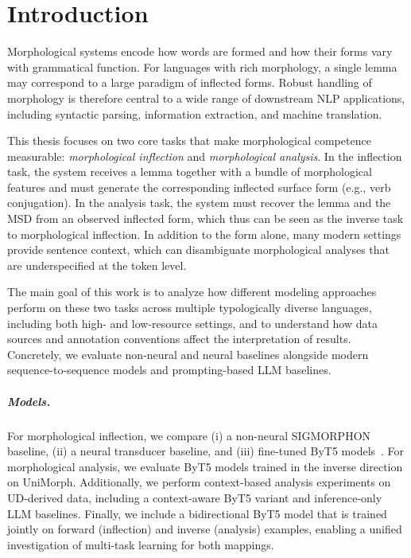 
\chapter{Introduction}\label{chapter:introduction}

Morphological systems encode how words are formed and how their forms vary with grammatical function. For languages with rich morphology, a single lemma may correspond to a large paradigm of inflected forms. Robust handling of morphology is therefore central to a wide range of downstream \ac{NLP} applications, including syntactic parsing, information extraction, and machine translation.

This thesis focuses on two core tasks that make morphological competence measurable: \emph{morphological inflection} and \emph{morphological analysis}. In the inflection task, the system receives a lemma together with a bundle of morphological features and must generate the corresponding inflected surface form (e.g., verb conjugation). In the analysis task, the system must recover the lemma and the \ac{MSD} from an observed inflected form, which thus can be seen as the inverse task to morphological inflection. In addition to the form alone, many modern settings provide sentence context, which can disambiguate morphological analyses that are underspecified at the token level.

The main goal of this work is to analyze how different modeling approaches perform on these two tasks across multiple typologically diverse languages, including both high- and low-resource settings, and to understand how data sources and annotation conventions affect the interpretation of results. Concretely, we evaluate non-neural and neural baselines alongside modern sequence-to-sequence models and prompting-based \ac{LLM} baselines.

\paragraph{Models.}
For morphological inflection, we compare (i) a non-neural SIGMORPHON baseline, (ii) a neural transducer baseline, and (iii) fine-tuned ByT5 models~\parencite{xue-etal-2022-byt5}. For morphological analysis, we evaluate ByT5 models trained in the inverse direction on UniMorph. Additionally, we perform context-based analysis experiments on \ac{UD}-derived data, including a context-aware ByT5 variant and inference-only LLM baselines. Finally, we include a bidirectional ByT5 model that is trained jointly on forward (inflection) and inverse (analysis) examples, enabling a unified investigation of multi-task learning for both mappings.

